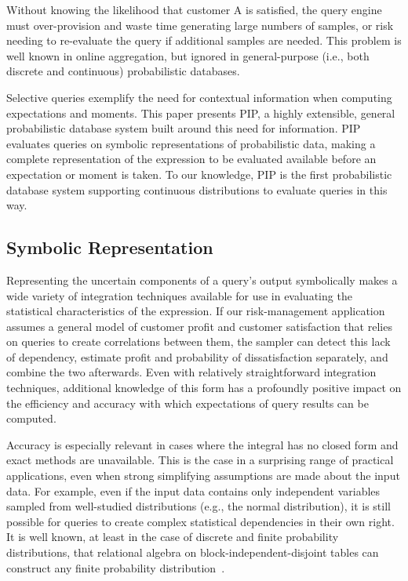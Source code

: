 Without knowing the likelihood that customer A is satisfied, the query engine must over-provision and waste time generating large numbers of samples, or risk needing to re-evaluate the query if additional samples are needed.  This problem is well known in online aggregation, but ignored in general-purpose (i.e., both discrete and continuous) probabilistic databases.  

Selective queries exemplify the need for contextual information when computing expectations and moments.  This paper presents PIP, a highly extensible, general probabilistic database system built around this need for information.  PIP evaluates queries on symbolic representations of probabilistic data, making a complete representation of the expression to be evaluated available before an expectation or moment is taken.  To our knowledge, PIP is the first probabilistic database system supporting continuous distributions to evaluate queries in this way.

\subsection{Symbolic Representation}
Representing the uncertain components of a query's output symbolically makes a wide variety of integration techniques available for use in evaluating the statistical characteristics of the expression.  If our risk-management application assumes a general model of customer profit and customer satisfaction that relies on queries to create correlations between them, the sampler can detect this lack of dependency, estimate profit and probability of dissatisfaction separately, and combine the two afterwards.  Even with relatively straightforward integration techniques, additional knowledge of this form has a profoundly positive impact on the efficiency and accuracy with which expectations of query results can be computed.

Accuracy is especially relevant in cases where the integral has no closed form and exact methods are unavailable.  This is the case in a surprising range of practical applications, even when strong simplifying assumptions are made about the input data.  For example, even if the input data contains only independent variables sampled from well-studied distributions (e.g., the normal distribution), it is still possible for queries to create complex statistical dependencies in their own right.  It is well known, at least in the case of discrete and finite probability distributions, that relational algebra on block-independent-disjoint tables can construct any finite probability distribution\ \cite{1325861,IL1984}.

